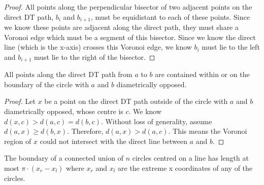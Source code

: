 \documentclass{tufte-handout}
\begin{document}
\begin{proof}

  All points along the perpendicular bisector of two adjacent points
  on the direct DT path, $b_i$ and $b_{i+1}$, must be equidistant to
  each of these points.  Since we know these points are adjacent along
  the direct path, they must share a Voronoi edge which must be a
  segment of this bisector.  Since we know the direct line (which is
  the x-axis) crosses this Voronoi edge, we know $b_i$ must lie to the
  left and $b_{i+1}$ must lie to the right of the bisector.
  
\end{proof}

\begin{Lemma}

  \label{lemma:circle:contains:path}

  All points along the direct DT path from $a$ to $b$ are contained
  within or on the boundary of the circle with $a$ and $b$
  diametrically opposed.  \footnotemark
  
\end{Lemma}

  
\begin{proof}
  
  Let $x$ be a point on the direct DT path outside of the circle
  with $a$ and $b$ diametrically opposed, whose centre is $c$.  We
  know $d(x,c) > d(a,c) = d(b,c)$.  Without loss of generality,
  assume $d(a,x) \ge d(b,x)$.  Therefore, $d(a,x) > d(a,c)$.  This
  means the Voronoi region of $x$ could not intersect with the
  direct line between $a$ and $b$.
  
\end{proof}

\newpage

\begin{Lemma}

  \label{lemma:boundary:circles}

  The boundary of a connected union of $n$ circles centred on a line
  has length at most $\pi \cdot ( x_r - x_l )$ where $x_r$ and $x_l$
  are the extreme x coordinates of any of the circles.
  
\end{Lemma}
\end{document}
